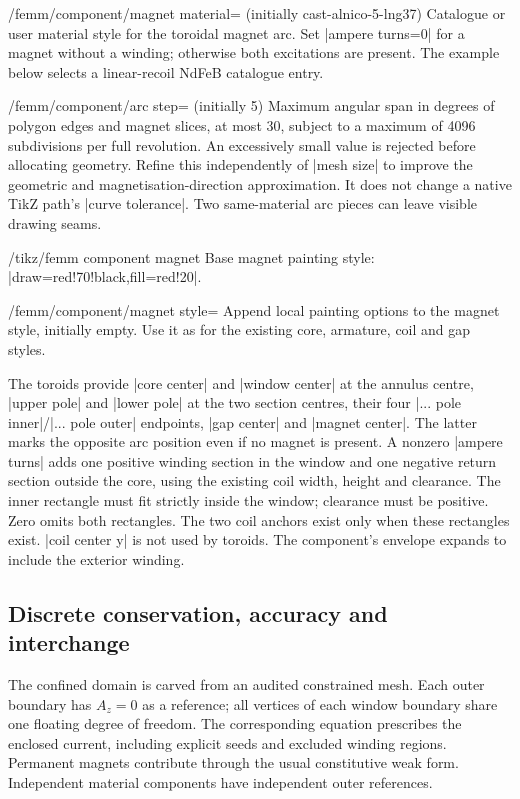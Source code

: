 \begin{key}{/femm/component/magnet material= (initially cast-alnico-5-lng37)}
Catalogue or user material style for the toroidal magnet arc. Set
|ampere turns=0| for a magnet without a winding; otherwise both excitations
are present. The example below selects a linear-recoil NdFeB catalogue entry.
\end{key}
\begin{key}{/femm/component/arc step= (initially 5)}
Maximum angular span in degrees of polygon edges and magnet slices, at most
30, subject to a maximum of 4096 subdivisions per full revolution.
An excessively small value is rejected before allocating geometry.
Refine this independently of |mesh size| to improve the geometric and
magnetisation-direction approximation. It does not change a native TikZ path's
|curve tolerance|. Two same-material arc pieces can leave visible drawing seams.
\end{key}
\begin{stylekey}{/tikz/femm component magnet}
Base magnet painting style: |draw=red!70!black,fill=red!20|.
\end{stylekey}
\begin{key}{/femm/component/magnet style=}
Append local painting options to the magnet style, initially empty.
Use it as for the existing core, armature, coil and gap styles.
\end{key}

The toroids provide |core center| and |window center| at the annulus centre,
|upper pole| and |lower pole| at the two section centres, their four
|... pole inner|/|... pole outer| endpoints, |gap center| and |magnet center|.
The latter marks the opposite arc position even if no magnet is present.
A nonzero |ampere turns| adds one positive winding section in the window and
one negative return section outside the core, using the existing coil width,
height and clearance. The inner rectangle must fit strictly inside the window;
clearance must be positive. Zero omits both rectangles. The two coil anchors
exist only when these rectangles exist. |coil center y| is not used by toroids.
The component's envelope expands to include the exterior winding.


\subsection{Discrete conservation, accuracy and interchange}
The confined domain is carved from an audited constrained mesh. Each outer
boundary has $A_z=0$ as a reference; all vertices of each window boundary
share one floating degree of freedom. The corresponding equation prescribes
the enclosed current, including explicit seeds and excluded winding regions.
Permanent magnets contribute through the usual constitutive weak form.
Independent material components have independent outer references.

